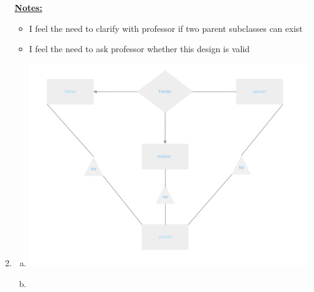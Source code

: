\documentclass[12pt]{article}
\begin{document}
\begin{enumerate}[1.]
    \bigskip

    \underline{\textbf{Notes:}}

    \bigskip

    \begin{itemize}
        \item I feel the need to clarify with professor if two parent subclasses can
        exist
        \item I feel the need to ask professor whether this design is valid
    \end{itemize}

    \item

    \begin{enumerate}[a)]
        \item

        \begin{center}
        \includegraphics[width=\linewidth]{images/worksheet_14_solution_31.png}
        \end{center}

        \item


\end{enumerate}
\end{enumerate}
\end{document}
